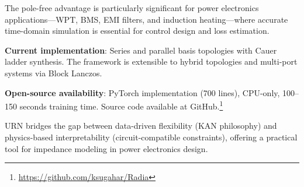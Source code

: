 \documentclass{ieeeaccess}
\begin{document}
The pole-free advantage is particularly significant for power electronics applications---WPT, BMS, EMI filters, and induction heating---where accurate time-domain simulation is essential for control design and loss estimation.

\textbf{Current implementation}: Series and parallel basis topologies with Cauer ladder synthesis. The framework is extensible to hybrid topologies and multi-port systems via Block Lanczos.

\textbf{Open-source availability}: PyTorch implementation (700 lines), CPU-only, 100--150 seconds training time. Source code available at GitHub.\footnote{\url{https://github.com/ksugahar/Radia}}

URN bridges the gap between data-driven flexibility (KAN philosophy) and physics-based interpretability (circuit-compatible constraints), offering a practical tool for impedance modeling in power electronics design.




\EOD
\end{document}
